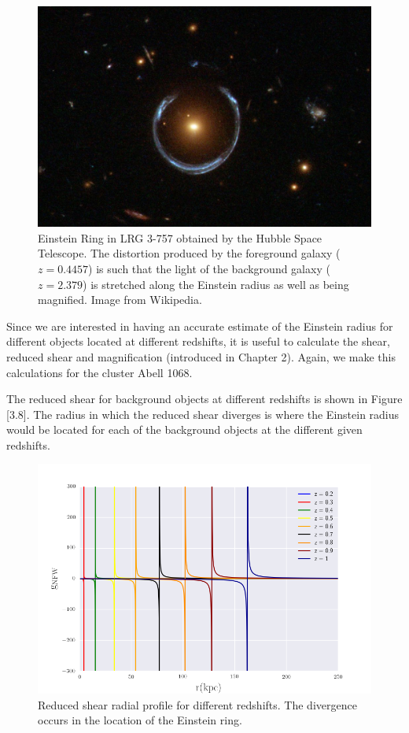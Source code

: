 \begin{figure}[H]
\centering
\includegraphics[width=12cm]{images/einstein_ring_wiki.jpg}
\caption[Einstein Ring in LRG 3-757]{Einstein Ring in LRG 3-757 obtained by the Hubble Space Telescope. The distortion produced by the foreground galaxy ($z=0.4457$) is such that the light of the background galaxy ($z=2.379$) is stretched along the Einstein radius as well as being magnified. Image from Wikipedia.}
\end{figure}

Since we are interested in having an accurate estimate of the Einstein radius for different objects located at different redshifts, it is useful to calculate the shear, reduced shear and magnification (introduced in Chapter 2). Again, we make this calculations for the cluster Abell 1068.

The reduced shear for background objects at different redshifts is shown in Figure [3.8]. The radius in which the reduced shear diverges is where the Einstein radius would be located for each of the background objects at the different given redshifts. 

\begin{figure}[H]
\centering
\includegraphics[width=12cm]{images/Reduced_Shear.png}
\caption[Reduced shear radial]{Reduced shear radial profile for different redshifts. The divergence occurs in the location of the Einstein ring.}
\end{figure}

